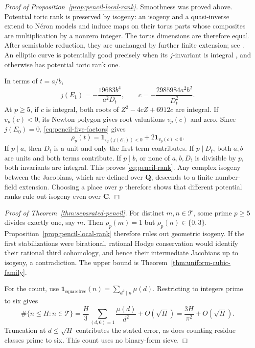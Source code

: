 \documentclass[11pt]{article}
\theoremstyle{remark}
\newcommand{\C}{\mathbf C}
\begin{document}
\begin{proof}[Proof of Proposition~\ref{prop:pencil-local-rank}]
Smoothness was proved above. Potential toric rank is preserved by isogeny:
an isogeny and a quasi-inverse extend to N\'eron models and induce maps on
their torus parts whose composites are multiplication by a nonzero integer.
The torus dimensions are therefore equal. After semistable reduction, they
are unchanged by further finite extension; see \cite[Corollary~3.3]{Reduction}.
An elliptic curve is potentially good precisely when its \(j\)-invariant
is integral \cite{Snowden}, and otherwise has potential toric rank one.

In terms of \(t=a/b\),
\[
 j(E_1)=-\frac{19683b^4}{a^2D_t},\qquad
 c=-\frac{2985984a^2b^2}{D_t^2}.
\]
At \(p\geq5\), if \(c\) is integral, both roots of
\(Z^2-4cZ+6912c\) are integral. If \(v_p(c)<0\), its Newton polygon
gives root valuations \(v_p(c)\) and zero. Since \(j(E_0)=0\),
\eqref{eq:pencil-five-factors} gives
\[
 \rho_p(t)=\mathbf1_{v_p(j(E_1))<0}+2\mathbf1_{v_p(c)<0}.
\]
If \(p\mid a\), then \(D_t\) is a unit and only the first term
contributes. If \(p\mid D_t\), both \(a,b\) are units and both terms
contribute. If \(p\mid b\), or none of \(a,b,D_t\) is divisible by
\(p\), both invariants are integral. This proves \eqref{eq:pencil-rank}.
Any complex isogeny between the Jacobians, which are defined over
\(\mathbf Q\), descends to a finite number-field extension. Choosing a
place over \(p\) therefore shows that different potential ranks rule out
isogeny even over \(\C\).
%
%
\end{proof}

\begin{proof}[Proof of Theorem~\ref{thm:separated-pencil}]
For distinct \(m,n\in\mathcal T\), some prime \(p\geq5\) divides exactly
one, say \(m\). Then \(\rho_p(m)=1\) but
\(\rho_p(n)\in\{0,3\}\). Proposition~\ref{prop:pencil-local-rank}
therefore rules out geometric isogeny. If the first stabilizations were
birational, rational Hodge conservation \cite[Theorem~1.3]{RuddM1} would
identify their rational third cohomology, and hence their intermediate
Jacobians up to isogeny, a contradiction. The upper bound is
Theorem~\ref{thm:uniform-cubic-family}.

For the count, use \(\mathbf1_{\text{squarefree}}(n)=\sum_{d^2\mid n}\mu(d)\).
Restricting to integers prime to six gives
\[
 \#\{n\leq H:n\in\mathcal T\}
 =\frac H3\sum_{(d,6)=1}\frac{\mu(d)}{d^2}+O(\sqrt H)
 =\frac{3H}{\pi^2}+O(\sqrt H).
\]
Truncation at \(d\leq\sqrt H\) contributes the stated error, as does
counting residue classes prime to six. This count uses no binary-form sieve.
%
%
\end{proof}
\end{document}
